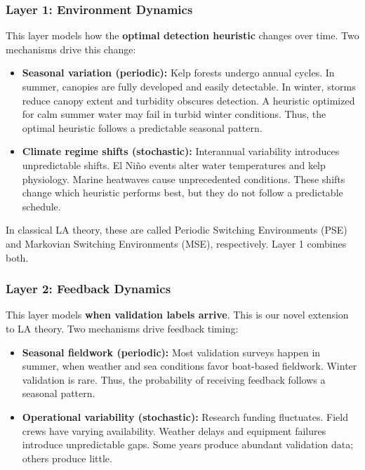 \documentclass[11pt,a4paper]{article}
\begin{document}
\subsubsection{Layer 1: Environment Dynamics}

This layer models how the \textbf{optimal detection heuristic} changes over time. Two mechanisms drive this change:

\begin{itemize}
    \item \textbf{Seasonal variation (periodic):} Kelp forests undergo annual cycles. In summer, canopies are fully developed and easily detectable. In winter, storms reduce canopy extent and turbidity obscures detection. A heuristic optimized for calm summer water may fail in turbid winter conditions. Thus, the optimal heuristic follows a predictable seasonal pattern.

    \item \textbf{Climate regime shifts (stochastic):} Interannual variability introduces unpredictable shifts. El Ni\~{n}o events alter water temperatures and kelp physiology. Marine heatwaves cause unprecedented conditions. These shifts change which heuristic performs best, but they do not follow a predictable schedule.
\end{itemize}

In classical LA theory, these are called Periodic Switching Environments (PSE) and Markovian Switching Environments (MSE), respectively. Layer 1 combines both.

\subsubsection{Layer 2: Feedback Dynamics}

This layer models \textbf{when validation labels arrive}. This is our novel extension to LA theory. Two mechanisms drive feedback timing:

\begin{itemize}
    \item \textbf{Seasonal fieldwork (periodic):} Most validation surveys happen in summer, when weather and sea conditions favor boat-based fieldwork. Winter validation is rare. Thus, the probability of receiving feedback follows a seasonal pattern.

    \item \textbf{Operational variability (stochastic):} Research funding fluctuates. Field crews have varying availability. Weather delays and equipment failures introduce unpredictable gaps. Some years produce abundant validation data; others produce little.
\end{itemize}
\end{document}
